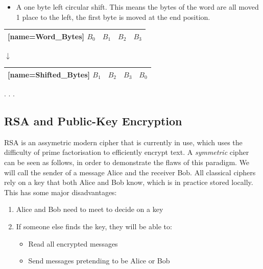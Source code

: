 \documentclass{article}
\begin{document}
\begin{itemize}

    \item A one byte left circular shift. This means the bytes of the word are all moved 1 place to the left, the first byte is moved at the end position.
    
\end{itemize}
\begin{center}
\begin{NiceTabular}{|c|c|c|c|}[name=Word_Bytes]
\hline
\(B_{0}\)&\(B_{1}\)&\(B_{2}\)&\(B_{3}\)\\
\hline
\end{NiceTabular}
\end{center}
\begin{center}
$\downarrow$
\end{center}
\begin{center}
\begin{NiceTabular}{|c|c|c|c|}[name=Shifted_Bytes]
\hline
\(B_{1}\)&\(B_{2}\)&\(B_{3}\)&\(B_{0}\)\\  
\hline
\end{NiceTabular}
\end{center}
 . . .


\subsection{RSA and Public-Key Encryption}
RSA is an assymetric modern cipher that is currently in use, which uses the
difficulty of prime factorisation to efficiently encrypt text.
A \textit{symmetric} cipher can be seen as follows, in order to demonstrate the 
flaws of this paradigm.
\medskip
We will call the sender of a message Alice and the receiver Bob.
All classical ciphers rely on a key that both Alice and Bob know, which is 
in practice stored locally.
This has some major disadvantages:

\begin{enumerate}
   \item Alice and Bob need to meet to decide on a key
   \item If someone else finds the key, they will be able to:

   \begin{itemize}
      \item Read all encrypted messages
      \item Send messages pretending to be Alice or Bob
   \end{itemize}

\end{enumerate}
\end{document}
